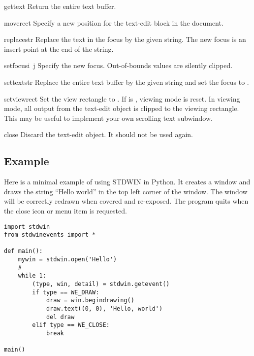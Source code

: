 \begin{funcdesc}{gettext}{}
Return the entire text buffer.
\end{funcdesc}

\begin{funcdesc}{move}{rect}
Specify a new position for the text-edit block in the document.
\end{funcdesc}

\begin{funcdesc}{replace}{str}
Replace the text in the focus by the given string.
The new focus is an insert point at the end of the string.
\end{funcdesc}

\begin{funcdesc}{setfocus}{i\, j}
Specify the new focus.
Out-of-bounds values are silently clipped.
\end{funcdesc}

\begin{funcdesc}{settext}{str}
Replace the entire text buffer by the given string and set the focus
to .
\end{funcdesc}

\begin{funcdesc}{setview}{rect}
Set the view rectangle to .  If  is ,
viewing mode is reset.  In viewing mode, all output from the text-edit
object is clipped to the viewing rectangle.  This may be useful to
implement your own scrolling text subwindow.
\end{funcdesc}

\begin{funcdesc}{close}{}
Discard the text-edit object.  It should not be used again.
\end{funcdesc}

\subsection{Example}

Here is a minimal example of using STDWIN in Python.
It creates a window and draws the string ``Hello world'' in the top
left corner of the window.
The window will be correctly redrawn when covered and re-exposed.
The program quits when the close icon or menu item is requested.

\begin{verbatim}
import stdwin
from stdwinevents import *

def main():
    mywin = stdwin.open('Hello')
    #
    while 1:
        (type, win, detail) = stdwin.getevent()
        if type == WE_DRAW:
            draw = win.begindrawing()
            draw.text((0, 0), 'Hello, world')
            del draw
        elif type == WE_CLOSE:
            break

main()
\end{verbatim}
%
